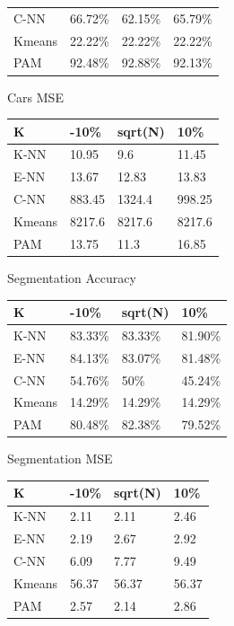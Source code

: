 \documentclass[twoside,11pt]{article}
\begin{document}
\begin{table}[h]
\begin{minipage}[b]{0.45\linewidth}
\begin{tabular}{llll}
			C-NN   & 66.72\% & 62.15\% & 65.79\% \\
			Kmeans & 22.22\% & 22.22\% & 22.22\% \\
			PAM    & 92.48\% & 92.88\% & 92.13\%
		\end{tabular}
	\end{minipage}
	\hspace{0.5cm}\centering
	\begin{minipage}[b]{0.45\linewidth}
		Cars MSE
		\centering
		\begin{tabular}{llll}
			\hline
			K      & -10\%  & sqrt(N) & 10\%   \\ \hline
			K-NN   & 10.95  & 9.6     & 11.45  \\
			E-NN   & 13.67  & 12.83   & 13.83  \\
			C-NN   & 883.45 & 1324.4  & 998.25 \\
			Kmeans & 8217.6 & 8217.6  & 8217.6 \\
			PAM    & 13.75  & 11.3    & 16.85
		\end{tabular}
	\end{minipage}
	\begin{minipage}[b]{0.45\linewidth}\centering
		Segmentation Accuracy
		\begin{tabular}{llll}
			\hline
			K      & -10\%   & sqrt(N) & 10\%    \\ \hline
			K-NN   & 83.33\% & 83.33\% & 81.90\% \\
			E-NN   & 84.13\% & 83.07\% & 81.48\% \\
			C-NN   & 54.76\% & 50\%    & 45.24\% \\
			Kmeans & 14.29\% & 14.29\% & 14.29\% \\
			PAM    & 80.48\% & 82.38\% & 79.52\%
		\end{tabular}
	\end{minipage}
	\hspace{0.5cm}
	\begin{minipage}[b]{0.45\linewidth}
		Segmentation MSE
		\centering
		\begin{tabular}{llll}
			\hline
			K      & -10\% & sqrt(N) & 10\%  \\ \hline
			K-NN   & 2.11  & 2.11    & 2.46  \\
			E-NN   & 2.19  & 2.67    & 2.92  \\
			C-NN   & 6.09  & 7.77    & 9.49  \\
			Kmeans & 56.37 & 56.37   & 56.37 \\
			PAM    & 2.57  & 2.14    & 2.86

\end{tabular}
\end{minipage}
\end{table}
\end{document}
